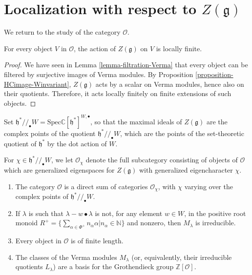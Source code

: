 \section{Localization with respect to $Z(\mathfrak g)$}
\label{section-localization}

We return to the study of the category $\mathcal O$. 

\begin{lemma}
For every object $V$ in $\mathcal O$, the action of $Z(\mathfrak g)$ on $V$ is locally finite.
\end{lemma}

\begin{proof}
We have seen in Lemma \ref{lemma-filtration-Verma} that every object can be filtered by surjective images of Verma modules. By Proposition \ref{proposition-HCimage-Winvariant}, $Z(\mathfrak g)$ acts by a scalar on Verma modules, hence also on their quotients. Therefore, it acts locally finitely on finite extensions of such objects.
\end{proof}



Set $\mathfrak h^*//_\bullet W = \text{Spec} \mathbb C[\mathfrak h^*]^{W,\bullet}$, so that the maximal ideals of $Z(\mathfrak g)$ are the complex points of the quotient $\mathfrak h^*//_\bullet W$, which are the points of the set-theoretic quotient of $\mathfrak h^*$ by the dot action of $W$.  

For $\chi\in \mathfrak h^*//_\bullet W$, we let $\mathcal O_\chi$ denote the full subcategory consisting of objects of $\mathcal O$ which are generalized eigenspaces for $Z(\mathfrak g)$ with generalized eigencharacter $\chi$. 

\begin{theorem}
\label{theorem-decomposition-O}
 \begin{enumerate}
  \item The category $\mathcal O$ is a direct sum of categories $\mathcal O_\chi$, with $\chi$ varying over the complex points of $\mathfrak h^*//_\bullet W$.
  \item If $\lambda$ is such that $\lambda-w\bullet \lambda$ is not, for any element $w\in W$, in the positive root monoid $R^+=\{\sum_{\alpha\in\Phi^+} n_\alpha \alpha | n_\alpha\in\mathbb N\}$ and nonzero, then $M_\lambda$ is irreducible.
  \item Every object in $\mathcal O$ is of finite length. 
  \item The classes of the Verma modules $M_\lambda$ (or, equivalently, their irreducible quotients $L_\lambda$) are a basis for the Grothendieck group $\mathbb Z[\mathcal{O}]$.
 \end{enumerate}
\end{theorem}


